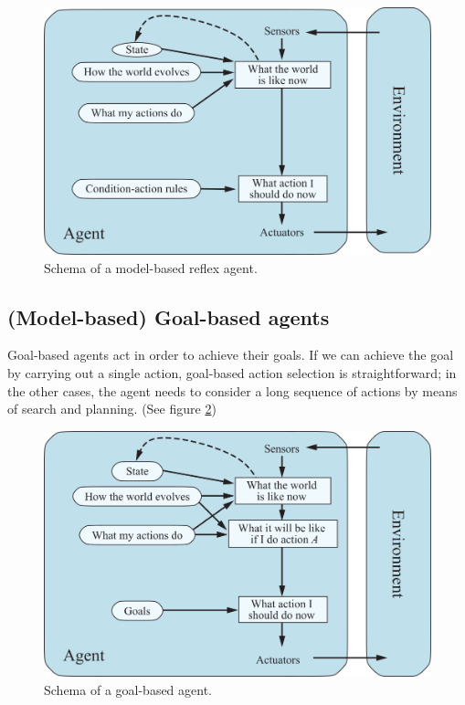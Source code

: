 \begin{figure}[hbtp]
    \centering
    \includegraphics{Images/Chapter 1/model-based-reflex-agent.png}
    \caption{Schema of a model-based reflex agent.}
    \label{fig:ch1-modelbasedreflexagent}
\end{figure}

\subsection{(Model-based) Goal-based agents}
Goal-based agents act in order to achieve their goals. If we can achieve the goal by carrying out a single action, goal-based action selection is straightforward; in the other cases, the agent needs to consider a long sequence of actions by means of search and planning. (See figure \ref{fig:ch1-goalbasedagent})

\begin{figure}[hbtp]
    \centering
    \includegraphics{Images/Chapter 1/goal-based-agent.png}
    \caption{Schema of a goal-based agent.}
    \label{fig:ch1-goalbasedagent}
\end{figure}

